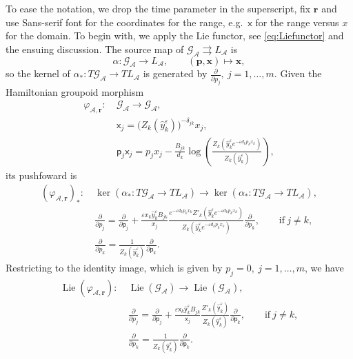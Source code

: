 \documentclass{amsart}
\numberwithin{equation}{section}
\newcommand{\bfp}{{\boldsymbol{p}}}
\newcommand{\bfr}{{\boldsymbol{r}}}
\newcommand{\bfx}{{\boldsymbol{x}}}
\newcommand{\sfx}{{\mathsf{x}}}
\newcommand{\sfy}{{\mathsf{y}}}
\newcommand{\sfp}{{\mathsf{p}}}
\newcommand{\cA}{\mathcal{A}}
\newcommand{\cG}{\mathcal{G}}
\newcommand{\Lie}{\operatorname{Lie}}
\newcommand{\rra}{\rightrightarrows}
\begin{document}
To ease the notation, we drop the time parameter in the superscript, fix $\bfr$ and use Sans-serif font for the coordinates for the range, e.g.\ $\sfx$ for the range versus $x$ for the domain.
To begin with, we apply the Lie functor, see \eqref{eq:Liefunctor} and the ensuing discussion.
The source map of $\cG_\cA \rra L_\cA$ is 
\[
	\alpha: \cG_\cA \to L_\cA, \qquad (\bfp, \bfx) \mapsto \bfx,
\]
so the kernel of $\alpha_*: T\cG_\cA \to TL_\cA$ is generated by $\frac{\partial}{\partial p_j}, \> j = 1, \ldots, m$.
Given the Hamiltonian groupoid morphism
\begin{align*}
	\varphi_{\cA,\bfr}: ~& \cG_\cA \to \cG_\cA, \\
	& \sfx_j = \big(Z_k(\hat y_k^\varepsilon)\big)^{-\delta_{jk}}x_j, \\
	& \sfp_j \sfx_j = p_jx_j-\frac{B_{jk}}{d_k}\log\left(\frac{Z_k\left(\hat y_k^\varepsilon e^{-\varepsilon d_kp_kx_k}\right)}{Z_k(\hat y_k^\varepsilon)}\right),
\end{align*}
its pushfoward is
\begin{align*}
	\left(\varphi_{\cA,\bfr}\right)_*: ~& \ker(\alpha_*: T\cG_\cA \to TL_\cA) \to \ker(\alpha_*: T\cG_\cA \to TL_\cA),  \\
	& \frac{\partial}{\partial p_j} 
	= \frac{\partial}{\partial \sfp_j} + \frac{\varepsilon x_k \hat{y}_k^\varepsilon B_{jk}}{x_j} \frac{ e^{-\varepsilon d_k p_k x_k} Z'_k\left(\hat y_k^\varepsilon e^{-\varepsilon d_k p_k x_k}\right)}{Z_k\left(\hat y_k^\varepsilon e^{-\varepsilon d_k p_k x_k}\right)} \frac{\partial}{\partial p_k}, \qquad \text{if}~ j \ne k, \\
	& \frac{\partial}{\partial p_k}
	= \frac{1}{Z_k(\hat y_k^\varepsilon)}\frac{\partial}{\partial \sfp_k}.
\end{align*}
Restricting to the identity image, which is given by $p_j = 0, \> j = 1, \ldots, m$, we have
\begin{align*}
	\Lie \left(\varphi_{\cA,\bfr} \right): ~& \Lie \left(\cG_\cA \right) \to \Lie \left( \cG_\cA \right),  \\
	& \frac{\partial}{\partial p_j}
	= \frac{\partial}{\partial \sfp_j} + \frac{\varepsilon \sfx_k \hat{\sfy}_k^\varepsilon B_{jk}}{\sfx_j} \frac{Z'_k\left(\hat \sfy_k^\varepsilon \right)}{Z_k\left(\hat \sfy_k^\varepsilon \right)} \frac{\partial}{\partial \sfp_k}, \qquad \text{if}~ j \ne k, \\
	& \frac{\partial}{\partial p_k} 
	= \frac{1}{Z_k(\hat{\sfy}_k^\varepsilon)}\frac{\partial}{\partial \sfp_k}.
\end{align*}
\end{document}
